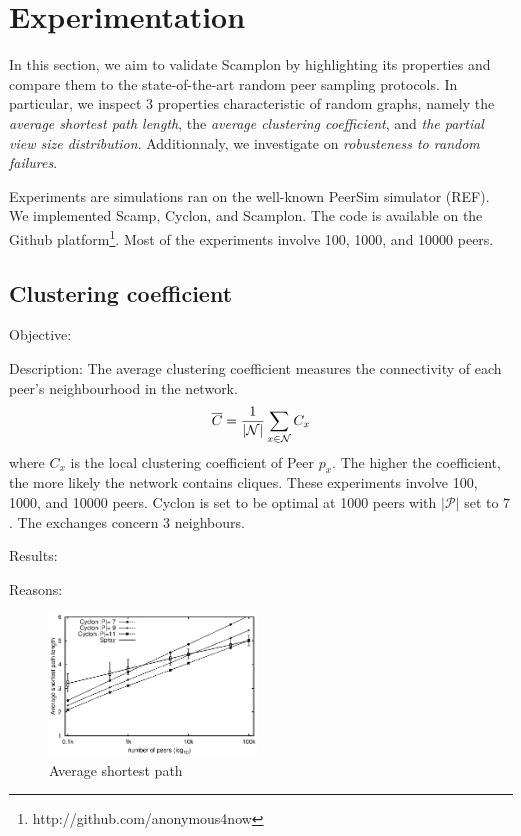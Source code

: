
\section{Experimentation}
\label{sec:experiments}
In this section, we aim to validate Scamplon by highlighting its properties and
compare them to the state-of-the-art random peer sampling protocols. In
particular, we inspect 3 properties characteristic of random graphs, namely the
\emph{average shortest path length}, the \emph{average clustering coefficient},
and \emph{the partial view size distribution}. Additionnaly, we investigate on
\emph{robusteness to random failures}.

Experiments are simulations ran on the well-known PeerSim simulator (REF). We
implemented Scamp, Cyclon, and Scamplon. The code is available on the Github
platform\footnote{http://github.com/anonymous4now}. Most of the experiments
involve 100, 1000, and 10000 peers.

\subsection{Clustering coefficient}
\begin{asparadesc}
\item[Objective:]
\item[Description:] The average clustering coefficient measures the
  connectivity of each peer's neighbourhood in the network.
  \begin{equation}
    \overline{C} = {1\over |\mathcal{N}|}\sum\limits_{x\in\mathcal{N}}C_x
    \end{equation}
    where $C_x$ is the local clustering coefficient of Peer $p_x$. The higher
    the coefficient, the more likely the network contains cliques. These
    experiments involve 100, 1000, and 10000 peers. Cyclon is set to be optimal
    at 1000 peers with $|\mathcal{P}|$ set to $7$. The exchanges concern $3$
    neighbours.
\item[Results:]
\item[Reasons:]
\end{asparadesc}

\begin{figure}
    \centering
    \includegraphics[width=0.49\textwidth]{img/avgpath.eps}
    \caption{Average shortest path}
    \label{fig:avgpath}
\end{figure}

